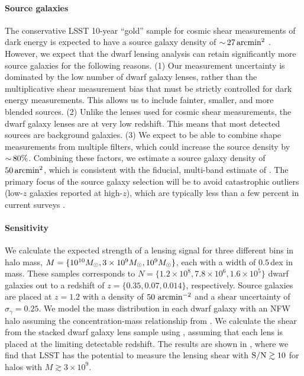 \paragraph{Source galaxies}
The conservative LSST 10-year ``gold'' sample for cosmic shear measurements of dark energy is expected to have a source galaxy density of $ {\sim}\, 27 \mathrm{\,arcmin}^2$ \citep{Chang:2013,1809.01669}. 
However, we expect that the dwarf lensing analysis can retain significantly more source galaxies for the following reasons.
(1) Our measurement uncertainty is dominated by the low number of dwarf galaxy lenses, rather than the  multiplicative shear measurement bias that must be strictly controlled for dark energy measurements. This allows us to include fainter, smaller, and more blended sources.
(2) Unlike the lenses used for cosmic shear measurements, the dwarf galaxy lenses are at very low redshift. This means that most detected sources are background galaxies.
(3) We expect to be able to combine shape measurements from multiple filters, which could increase the source density by $ {\sim}\, 80\%$. 
Combining these factors, we estimate a source galaxy density of $50 \mathrm{\,arcmin}^2$, which is consistent with the fiducial, multi-band estimate of \citet{Chang:2013}.
The primary focus of the source galaxy selection will be to avoid catastrophic \photoz outliers (low-$z$ galaxies reported at high-$z$), which are typically less than a few percent in current surveys \citep{1406.4407}. 

\paragraph{Sensitivity}
We calculate the expected strength of a lensing signal for three different bins in halo mass,  $M = \{10^{10} M_\odot, 3\times10^9 M_\odot, 10^{9} M_\odot \}$, each with a width of $0.5$\,dex in mass. 
These samples corresponds to $N = \{1.2\times10^8, 7.8\times10^6, 1.6\times10^5\}$ dwarf galaxies out to a redshift of $z = \{0.35, 0.07, 0.014\}$, respectively.
Source galaxies are placed at $z = 1.2$ with a density of $50 \hbox{ arcmin}^{-2}$ and a shear uncertainty of $\sigma_\gamma = 0.25$.
We model the mass distribution in each dwarf galaxy with an NFW halo assuming the concentration-mass relationship from \citet{1809.07326}.
We calculate the shear from the stacked dwarf galaxy lens sample using , assuming that each lens is  placed at the limiting detectable redshift.
The results are shown in , where we find that LSST has the potential to measure the lensing shear with ${\rm S/N} \gtrsim 10$ for halos with $M \gtrsim 3 \times 10^9$.

